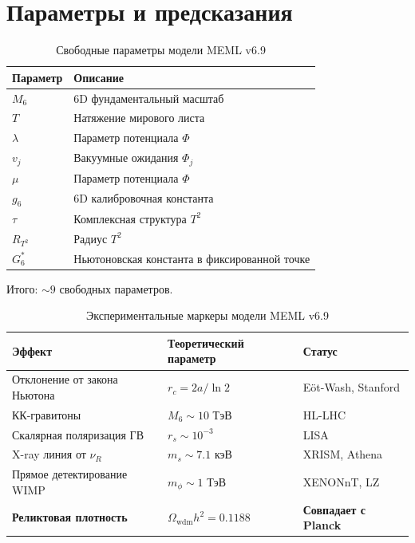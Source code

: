 \documentclass[11pt,letterpaper]{article}
\begin{document}
\section{Параметры и предсказания}

\begin{table}[h!]
\centering
\caption{Свободные параметры модели MEML v6.9}
\begin{tabular}{ll}
\toprule
\textbf{Параметр} & \textbf{Описание} \\
\midrule
$M_6$ & 6D фундаментальный масштаб \\
$T$ & Натяжение мирового листа \\
$\lambda$ & Параметр потенциала $\Phi$ \\
$v_j$ & Вакуумные ожидания $\Phi_j$ \\
$\mu$ & Параметр потенциала $\Phi$ \\
$g_6$ & 6D калибровочная константа \\
$\tau$ & Комплексная структура $T^2$ \\
$R_{T^2}$ & Радиус $T^2$ \\
$G_6^*$ & Ньютоновская константа в фиксированной точке \\
\bottomrule
\end{tabular}
\end{table}

Итого: $\sim 9$ свободных параметров.

\begin{table}[h!]
\centering
\caption{Экспериментальные маркеры модели MEML v6.9}
\begin{tabular}{lll}
\toprule
\textbf{Эффект} & \textbf{Теоретический параметр} & \textbf{Статус} \\
\midrule
Отклонение от закона Ньютона & $r_c = 2a/\ln 2$ & Eöt-Wash, Stanford \\
КК-гравитоны & $M_6 \sim 10$ ТэВ & HL-LHC \\
Скалярная поляризация ГВ & $r_s \sim 10^{-3}$ & LISA \\
X-ray линия от $\nu_R$ & $m_s \sim 7.1$ кэВ & XRISM, Athena \\
Прямое детектирование WIMP & $m_\phi \sim 1$ ТэВ & XENONnT, LZ \\
\textbf{Реликтовая плотность} & $\Omega_{\text{wdm}} h^2 = 0.1188$ & \textbf{Совпадает с Planck} \\
\bottomrule
\end{tabular}
\end{table}
\end{document}
